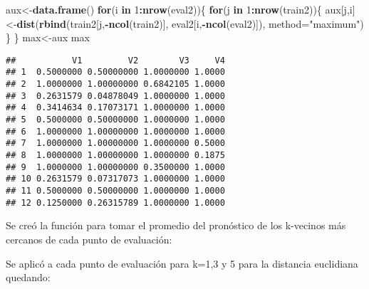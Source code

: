 \documentclass[]{article}
\newenvironment{Shaded}{\begin{snugshade}}{\end{snugshade}}
\newcommand{\KeywordTok}[1]{\textcolor[rgb]{0.13,0.29,0.53}{\textbf{#1}}}
\newcommand{\DataTypeTok}[1]{\textcolor[rgb]{0.13,0.29,0.53}{#1}}
\newcommand{\DecValTok}[1]{\textcolor[rgb]{0.00,0.00,0.81}{#1}}
\newcommand{\StringTok}[1]{\textcolor[rgb]{0.31,0.60,0.02}{#1}}
\newcommand{\ControlFlowTok}[1]{\textcolor[rgb]{0.13,0.29,0.53}{\textbf{#1}}}
\newcommand{\OperatorTok}[1]{\textcolor[rgb]{0.81,0.36,0.00}{\textbf{#1}}}
\newcommand{\NormalTok}[1]{#1}
\begin{document}
\begin{Shaded}
\begin{Highlighting}[]
\NormalTok{aux<-}\KeywordTok{data.frame}\NormalTok{()}
\ControlFlowTok{for}\NormalTok{(i }\ControlFlowTok{in} \DecValTok{1}\OperatorTok{:}\KeywordTok{nrow}\NormalTok{(eval2))\{}
  \ControlFlowTok{for}\NormalTok{(j }\ControlFlowTok{in} \DecValTok{1}\OperatorTok{:}\KeywordTok{nrow}\NormalTok{(train2))\{}
\NormalTok{    aux[j,i]<-}\KeywordTok{dist}\NormalTok{(}\KeywordTok{rbind}\NormalTok{(train2[j,}\OperatorTok{-}\KeywordTok{ncol}\NormalTok{(train2)], eval2[i,}\OperatorTok{-}\KeywordTok{ncol}\NormalTok{(eval2)]), }\DataTypeTok{method=}\StringTok{"maximum"}\NormalTok{) }
\NormalTok{  \}}
\NormalTok{\}}
\NormalTok{max<-aux}
\NormalTok{max}
\end{Highlighting}
\end{Shaded}

\begin{verbatim}
##           V1         V2        V3     V4
## 1  0.5000000 0.50000000 1.0000000 1.0000
## 2  1.0000000 1.00000000 0.6842105 1.0000
## 3  0.2631579 0.04878049 1.0000000 1.0000
## 4  0.3414634 0.17073171 1.0000000 1.0000
## 5  0.5000000 0.50000000 1.0000000 1.0000
## 6  1.0000000 1.00000000 1.0000000 1.0000
## 7  1.0000000 1.00000000 1.0000000 0.5000
## 8  1.0000000 1.00000000 1.0000000 0.1875
## 9  1.0000000 1.00000000 0.3500000 1.0000
## 10 0.2631579 0.07317073 1.0000000 1.0000
## 11 0.5000000 0.50000000 1.0000000 1.0000
## 12 0.1250000 0.26315789 1.0000000 1.0000
\end{verbatim}

Se creó la función para tomar el promedio del pronóstico de los
k-vecinos más cercanos de cada punto de evaluación:

\begin{Shaded}
\end{Shaded}

Se aplicó a cada punto de evaluación para k=1,3 y 5 para la distancia
euclidiana quedando:
\end{document}
